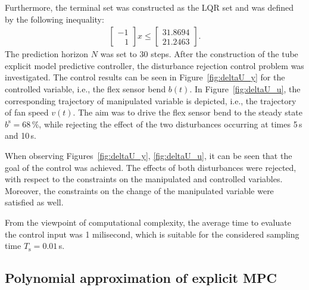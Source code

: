\documentclass[letterpaper, 10 pt, conference]{ieeeconf}
\begin{document}
	Furthermore, the terminal set was constructed as the LQR set and was defined by the following inequality:
	\begin{eqnarray}
		\label{eq:setup_terminal_set}
		\begin{bmatrix}
			-1 \\	
			\,\,\,\,\, 1
		\end{bmatrix} x \le 
		\begin{bmatrix}
			31.8694\\	
			21.2463
		\end{bmatrix}.
	\end{eqnarray}
	The prediction horizon $N$ was set to 30 steps. 
	After the construction of the tube explicit model predictive controller, the disturbance rejection control problem was investigated. The control results can be seen in Figure~\ref{fig:deltaU_y} for the controlled variable, i.e., the flex sensor bend $b(t)$. In Figure~\ref{fig:deltaU_u}, the corresponding trajectory of manipulated variable is depicted, i.e., the trajectory of fan speed $v(t)$. The aim was to drive the flex sensor bend to the steady state $ b^\mathrm{s} = 68\,\%$, while rejecting the effect of the two disturbances occurring at times 5\,s and 10\,s. 
	
	When observing Figures~\ref{fig:deltaU_y}, \ref{fig:deltaU_u}, it can be seen that the goal of the control was achieved. The effects of both disturbances were rejected, with respect to the constraints on the manipulated and controlled variables. Moreover, the constraints on the change of the manipulated variable were satisfied as well.
	
	From the viewpoint of computational complexity, the average time to evaluate the control input was 1 milisecond, which is suitable for the considered sampling time $T_\mathrm{s} = 0.01$\,s.
	
	\subsection{Polynomial approximation of explicit MPC}
	\label{sec:polynomial_exp}
	
\end{document}
